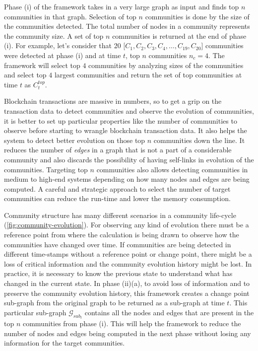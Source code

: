 Phase (i) of the framework takes in a very large graph as input and finds top $n$ communities in that graph.  Selection of top $n$ communities is done by the size of the communities detected. The total number of nodes in a community represents the community size. A set of top $n$ communities is returned at the end of phase (i). For example, let's consider that 20 [$C_1, C_2, C_3, C_4, \ldots , C_{19}, C_{20}$] communities were detected at phase (i) and at time $t$, top $n$ communities $n_{c} = 4$. The framework will select top $4$ communities by analyzing sizes of the communities and select top $4$ largest communities and return the set of top communities at time  $t$ as $C_t^{top}$. 

Blockchain transactions are massive in numbers, so to get a grip on the transaction data to detect communities and observe the evolution of communities, it is better to set up particular properties like the number of communities to observe before starting to wrangle blockchain transaction data. It also helps the system to detect better evolution on those top $n$ communities down the line. It reduces the number of \textit{edges} in a graph that is not a part of a considerable community and also discards the possibility of having self-links in evolution of the communities. Targeting top $n$ communities also allows detecting communities in medium to high-end systems depending on how many nodes and edges are being computed. A careful and strategic approach to select the number of target communities can reduce the run-time and lower the memory consumption.

Community structure has many different scenarios in a community life-cycle (\ref{fig:community-evolution}). For observing any kind of evolution there must be a reference point from where the calculation is being drawn to observe how the communities have changed over time. If communities are being detected in different time-stamps without a reference point or change point, there might be a loss of critical information and the community evolution history might be lost. In practice, it is necessary to know the previous state to understand what has changed in the current state. In phase (ii)(a), to avoid loss of information and to preserve the community evolution history, this framework creates a change point sub-graph from the original graph to be returned as a sub-graph at time $t$. This particular sub-graph $\mathcal{G}_{sub_{t}}$ contains all the nodes and edges that are present in the top $n$ communities from phase (i). This will help the framework to reduce the number of nodes and edges being computed in the next phase without losing any information for the target communities.

